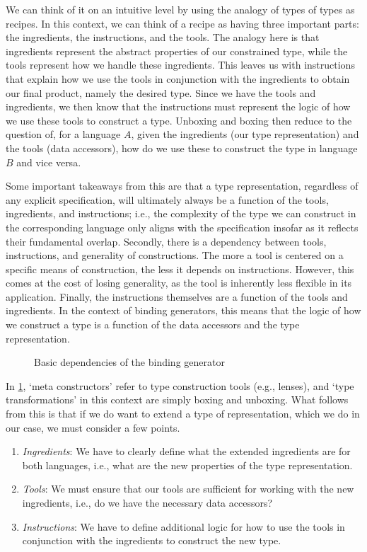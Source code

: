 We can think of it on an intuitive level by using the analogy of types of types as recipes. In this context, we can think of a recipe as having three important parts: the ingredients, the instructions, and the tools. The analogy here is that ingredients represent the abstract properties of our constrained type, while the tools represent how we handle these ingredients. This leaves us with instructions that explain how we use the tools in conjunction with the ingredients to obtain our final product, namely the desired type. Since we have the tools and ingredients, we then know that the instructions must represent the logic of how we use these tools to construct a type. Unboxing and boxing then reduce to the question of, for a language $A$, given the ingredients (our type representation) and the tools (data accessors), how do we use these to construct the type in language $B$ and vice versa. 

Some important takeaways from this are that a type representation, regardless of any explicit specification, will ultimately always be a function of the tools, ingredients, and instructions; i.e., the complexity of the type we can construct in the corresponding language only aligns with the specification insofar as it reflects their fundamental overlap. Secondly, there is a dependency between tools, instructions, and generality of constructions. The more a tool is centered on a specific means of construction, the less it depends on instructions. However, this comes at the cost of losing generality, as the tool is inherently less flexible in its application. Finally, the instructions themselves are a function of the tools and ingredients. In the context of binding generators, this means that the logic of how we construct a type is a function of the data accessors and the type representation. 

\begin{figure}[ht!]
  
  \caption{Basic dependencies of the binding generator}
  \label{fig:bg_basic_dependencies}
  \Description{}
\end{figure}

In \ref{fig:bg_basic_dependencies}, `meta constructors' refer to type construction tools (e.g., lenses), and `type transformations' in this context are simply boxing and unboxing. What follows from this is that if we do want to extend a type of representation, which we do in our case, we must consider a few points.
\begin{enumerate}
  \item \textit{Ingredients}: We have to clearly define what the extended ingredients are for both languages, i.e., what are the new properties of the type representation.
  \item \textit{Tools}: We must ensure that our tools are sufficient for working with the new ingredients, i.e., do we have the necessary data accessors?
  \item \textit{Instructions}: We have to define additional logic for how to use the tools in conjunction with the ingredients to construct the new type.  
\end{enumerate}

